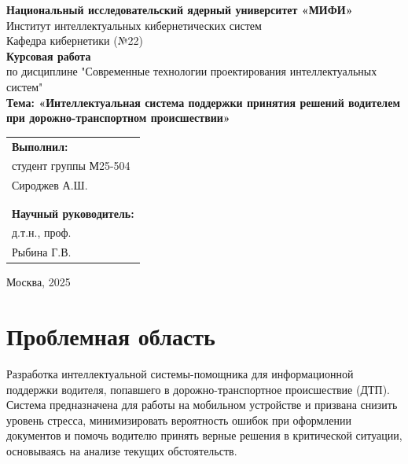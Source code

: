 \documentclass[12pt, a4paper]{article}
\begin{document}
\begin{titlepage}
    \centering
    \textbf{Национальный исследовательский ядерный университет «МИФИ»} \\
    \vspace{0.5cm}
    Институт интеллектуальных кибернетических систем \\
    \vspace{0.5cm}
    Кафедра кибернетики (№22) \\
    \vspace{2cm}
    \textbf{\Large Курсовая работа} \\
    \vspace{0.5cm}
    \large по дисциплине "Современные технологии проектирования интеллектуальных систем" \\
    \vspace{2cm}
    \textbf{\huge Тема: «Интеллектуальная система поддержки принятия решений водителем при дорожно-транспортном происшествии»} \\
    
    \begin{flushright}
        \begin{tabular}{l}
            \large
            \textbf{Выполнил:} \\
            студент группы М25-504 \\
            Сироджев А.Ш. \\
            \\
            \\
            \textbf{Научный руководитель:} \\
            д.т.н., проф. \\
            Рыбина Г.В. \\
        \end{tabular}
    \end{flushright}
    
    \large Москва, 2025
\end{titlepage}

\section*{Проблемная область}

Разработка интеллектуальной системы-помощника для информационной поддержки водителя, попавшего в дорожно-транспортное происшествие (ДТП). Система предназначена для работы на мобильном устройстве и призвана снизить уровень стресса, минимизировать вероятность ошибок при оформлении документов и помочь водителю принять верные решения в критической ситуации, основываясь на анализе текущих обстоятельств.
\end{document}
